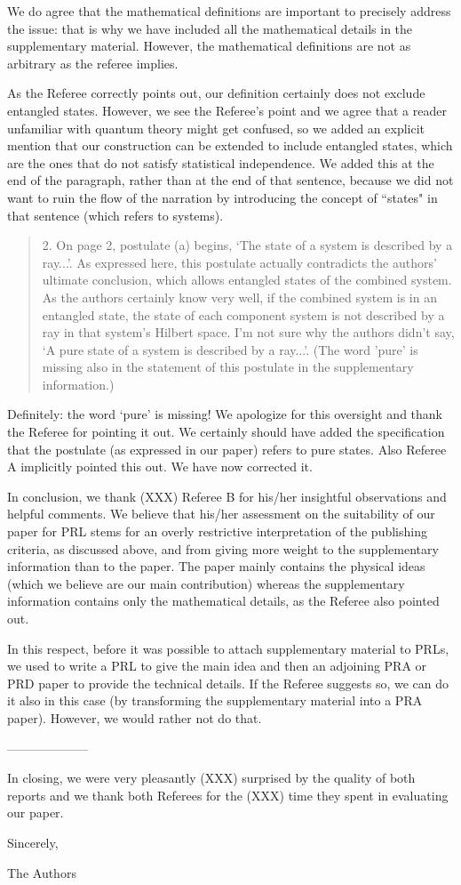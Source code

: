 \documentclass[11pt]{article}
\begin{document}
We do agree that the mathematical definitions are important to precisely
address the issue: that is why we have included all the mathematical
details in the supplementary material. However, the mathematical definitions
are not as arbitrary as the referee implies.

As the Referee correctly points out, our definition certainly does not
exclude entangled states. However, we see the Referee's point and we
agree that a reader unfamiliar with quantum theory might get confused,
so we added an explicit mention that our construction can be extended
to include entangled states, which are the ones that do not satisfy
statistical independence. We added this at the end of the paragraph,
rather than at the end of that sentence, because we did not want to
ruin the flow of the narration by introducing the concept of ``states"
in that sentence (which refers to systems).

\begin{quote}
2. On page 2, postulate (a) begins, `The state of a system
is described by a ray...'. As expressed here, this postulate actually
contradicts the authors' ultimate conclusion, which allows entangled
states of the combined system. As the authors certainly know very
well, if the combined system is in an entangled state, the state of
each component system is not described by a ray in that system's
Hilbert space. I'm not sure why the authors didn't say, `A pure state
of a system is described by a ray...'. (The word 'pure' is missing
also in the statement of this postulate in the supplementary
information.)
\end{quote}

Definitely: the word `pure' is missing! We apologize for this
oversight and thank the Referee for pointing it out. We certainly
should have added the specification that the postulate (as expressed
in our paper) refers to pure states. Also Referee A implicitly pointed
this out. We have now corrected it.

In conclusion, we thank (XXX) Referee B for his/her insightful
observations and helpful comments. We believe that his/her assessment
on the suitability of our paper for PRL stems for an overly
restrictive interpretation of the publishing criteria, as discussed
above, and from giving more weight to the supplementary information
than to the paper. The paper mainly contains the physical ideas (which
we believe are our main contribution) whereas the supplementary
information contains only the mathematical details, as the Referee
also pointed out.

In this respect, before it was possible to attach supplementary
material to PRLs, we used to write a PRL to give the main idea and
then an adjoining PRA or PRD paper to provide the technical
details. If the Referee suggests so, we can do it also in this case
(by transforming the supplementary material into a PRA
paper). However, we would rather not do that.

--------------------


In closing, we were very pleasantly (XXX) surprised by the quality of both
reports and we thank both Referees for the (XXX) time they spent in
evaluating our paper.

Sincerely,

The Authors
\end{document}
